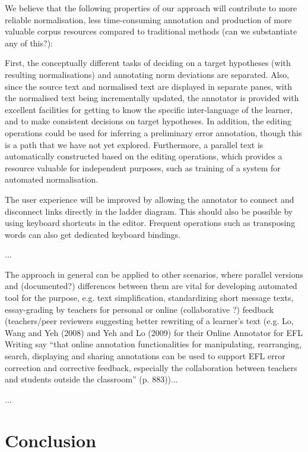 \documentclass[10pt, a4paper]{article}
\begin{document}
We believe that the following properties of our approach will contribute to more reliable normalisation, less time-consuming annotation and production of more valuable corpus resources compared to traditional methods (can we substantiate any of this?):

First, the conceptually different tasks of deciding on a target hypotheses (with resulting normalisations) and annotating norm deviations are separated. Also, since the source text and normalised text are displayed in separate panes, with the normalised text being incrementally updated, the annotator is provided with excellent facilities for getting to know the specific inter-language of the learner, and to make consistent decisions on target hypotheses. In addition, the editing operations could be used for inferring a preliminary error annotation, though this is a path that we have not yet explored. Furthermore, a parallel text is automatically constructed based on the editing operations, which provides a resource valuable for independent purposes, such as training of a system for automated normalisation.

The user experience will be improved by allowing the annotator to connect
and disconnect links directly in the ladder diagram. This should also be
possible by using keyboard shortcuts in the editor.  Frequent operations
such as transposing words can also get dedicated keyboard bindings.

...

The approach in general can be applied to other scenarios, where parallel versions and (documented?) differences between them are vital for developing automated tool for the purpose, e.g. text simplification, standardizing short message texts, essay-grading by teachers for personal or online (collaborative ?) feedback (teachers/peer reviewers suggesting better rewriting of a learner's text (e.g. Lo, Wang and Yeh (2008) and Yeh and Lo (2009) for their Online Annotator for EFL Writing say   “that online annotation functionalities for manipulating, rearranging, search, displaying and sharing annotations can be used to support EFL error correction and corrective feedback, especially the collaboration between teachers and students outside the classroom” (p. 883))...

...


\section{Conclusion}
\label{sec:conclusions}
\end{document}
